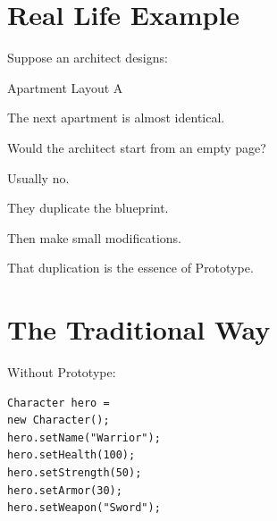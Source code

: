 \documentclass[11pt,a4paper]{book}
\begin{document}

\section{Real Life Example}

Suppose an architect designs:


Apartment Layout A


The next apartment is almost
identical.


Would the architect start from
an empty page?


Usually no.


They duplicate the blueprint.


Then make small modifications.


That duplication is the essence
of Prototype.


\section{The Traditional Way}

Without Prototype:

\begin{verbatim}
Character hero =
new Character();
hero.setName("Warrior");
hero.setHealth(100);
hero.setStrength(50);
hero.setArmor(30);
hero.setWeapon("Sword");
\end{verbatim}

\end{document}
